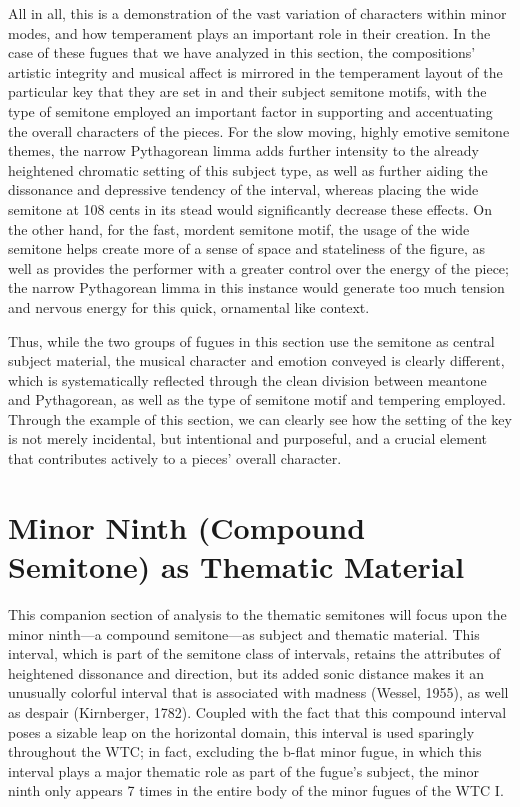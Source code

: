     All in all, this is a demonstration of the vast variation of characters
within minor modes, and how temperament plays an important role in their
creation. In the case of these fugues that we have analyzed in this
section, the compositions' artistic integrity and musical affect is
mirrored in the temperament layout of the particular key that they are
set in and their subject semitone motifs, with the type of semitone
employed an important factor in supporting and accentuating the overall
characters of the pieces. For the slow moving, highly emotive semitone
themes, the narrow Pythagorean limma adds further intensity to the
already heightened chromatic setting of this subject type, as well as
further aiding the dissonance and depressive tendency of the interval,
whereas placing the wide semitone at 108 cents in its stead would
significantly decrease these effects. On the other hand, for the fast,
mordent semitone motif, the usage of the wide semitone helps create more
of a sense of space and stateliness of the figure, as well as provides
the performer with a greater control over the energy of the piece; the
narrow Pythagorean limma in this instance would generate too much
tension and nervous energy for this quick, ornamental like context.

Thus, while the two groups of fugues in this section use the semitone as
central subject material, the musical character and emotion conveyed is
clearly different, which is systematically reflected through the clean
division between meantone and Pythagorean, as well as the type of
semitone motif and tempering employed. Through the example of this
section, we can clearly see how the setting of the key is not merely
incidental, but intentional and purposeful, and a crucial element that
contributes actively to a pieces' overall character.

    \section{Minor Ninth (Compound Semitone) as Thematic
Material}\label{minor-ninth-compound-semitone-as-thematic-material}

This companion section of analysis to the thematic semitones will focus
upon the minor ninth---a compound semitone---as subject and
thematic material. This interval, which is part of the semitone class of
intervals, retains the attributes of heightened dissonance and
direction, but its added sonic distance makes it an unusually colorful
interval that is associated with madness (Wessel, 1955), as well as
despair (Kirnberger, 1782). Coupled with the fact that this compound
interval poses a sizable leap on the horizontal domain, this interval is
used sparingly throughout the WTC; in fact, excluding the b-flat minor
fugue, in which this interval plays a major thematic role as part of the
fugue's subject, the minor ninth only appears 7 times in the entire body
of the minor fugues of the WTC I.


